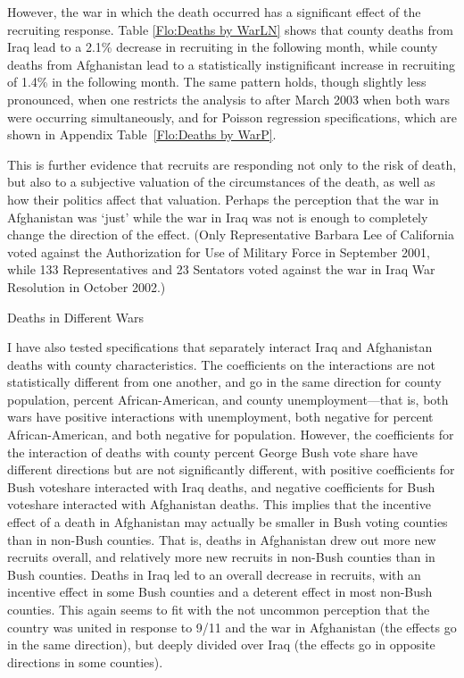 \documentclass[12pt] {article}
\begin{document}
However, the war in which the death occurred has a significant effect of the recruiting response. Table \ref{Flo:Deaths by WarLN} shows that county deaths from Iraq lead to a 2.1\% decrease in recruiting in the following month, while county deaths from Afghanistan lead to a statistically instignificant increase in recruiting of 1.4\% in the following month. The same pattern holds, though slightly less pronounced, when one restricts the analysis to after March 2003 when both wars were occurring simultaneously, and for Poisson regression specifications, which are shown in Appendix Table~\ref{Flo:Deaths by WarP}. 

This is further evidence that recruits are responding not only to the risk of death, but also to a subjective valuation of the circumstances of the death, as well as how their politics affect that valuation. Perhaps the perception that the war in Afghanistan was `just' while the war in Iraq was not is enough to completely change the direction of the effect. (Only Representative Barbara Lee of California voted against the Authorization for Use of Military Force in September 2001, while 133 Representatives and 23 Sentators voted against the war in Iraq War Resolution in October 2002.)
\begin{table}
\caption{Deaths in Different Wars}
\label{Flo:Deaths by WarLN}
\scalebox{0.8}{

}
\end{table}


I have also tested specifications that separately interact Iraq and Afghanistan deaths with county characteristics. The coefficients on the interactions are not statistically different from one another, and go in the same direction for county population, percent African-American, and county unemployment---that is, both wars have positive interactions with unemployment, both negative for percent African-American, and both negative for population. However, the coefficients for the interaction of deaths with county percent George Bush vote share have different directions but are not significantly different, with positive coefficients for Bush voteshare interacted with Iraq deaths, and negative coefficients for Bush voteshare interacted with Afghanistan deaths. This implies that the incentive effect of a death in Afghanistan may actually be smaller in Bush voting counties than in non-Bush counties. That is, deaths in Afghanistan drew out more new recruits overall, and relatively more new recruits in non-Bush counties than in Bush counties. Deaths in Iraq led to an overall decrease in recruits, with an incentive effect in some Bush counties and a deterent effect in most non-Bush counties. This again seems to fit with the not uncommon perception that the country was united in response to 9/11 and the war in Afghanistan (the effects go in the same direction), but deeply divided over Iraq (the effects go in opposite directions in some counties). 
\end{document}
